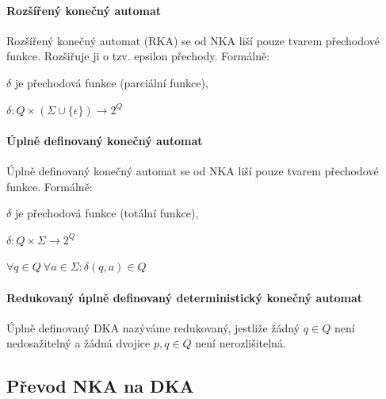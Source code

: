 \paragraph*{Rozšířený konečný automat} Rozšířený konečný automat (RKA) se od NKA liší pouze tvarem přechodové funkce. Rozšiřuje ji o tzv. epsilon přechody. Formálně: \begin{compactitem}
    \item $\delta$ je přechodová funkce (parciální funkce), \begin{compactitem}
        \item $\delta : Q \times (\Sigma \cup \{ \epsilon \}) \rightarrow 2^Q$
    \end{compactitem}
\end{compactitem}

\paragraph*{Úplně definovaný konečný automat} Úplně definovaný konečný automat se od NKA liší pouze tvarem přechodové funkce. Formálně: \begin{compactitem}
    \item $\delta$ je přechodová funkce (totální funkce), \begin{compactitem}
        \item $\delta : Q \times \Sigma \rightarrow 2^Q$
        \item $\forall q \in Q ~ \forall a \in \Sigma : \delta(q, a) \in Q$
    \end{compactitem}
\end{compactitem}

\paragraph*{Redukovaný úplně definovaný deterministický konečný automat} Úplně definovaný DKA nazýváme redukovaný, jestliže žádný $q \in Q$ není nedosažitelný a žádná dvojice $p, q \in Q$ není nerozlišitelná.

\subsection{Převod NKA na DKA}

